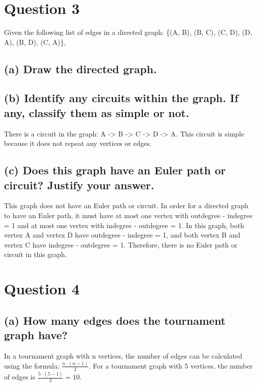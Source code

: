 \documentclass{article}
\begin{document}
\section*{Question 3}

Given the following list of edges in a directed graph: \{(A, B), (B, C), (C, D), (D, A), (B, D), (C, A)\},

\subsection*{(a) Draw the directed graph.}
\begin{center}
\end{center}

\subsection*{(b) Identify any circuits within the graph. If any, classify them as simple or not.}
There is a circuit in the graph: A -> B -> C -> D -> A. This circuit is simple because it does not repeat any vertices or edges.

\subsection*{(c) Does this graph have an Euler path or circuit? Justify your answer.}
This graph does not have an Euler path or circuit. In order for a directed graph to have an Euler path, it must have at most one vertex with outdegree - indegree = 1 and at most one vertex with indegree - outdegree = 1. In this graph, both vertex A and vertex D have outdegree - indegree = 1, and both vertex B and vertex C have indegree - outdegree = 1. Therefore, there is no Euler path or circuit in this graph.

\section*{Question 4}
\subsection*{(a) How many edges does the tournament graph have?}
In a tournament graph with n vertices, the number of edges can be calculated using the formula: \( \frac{{n \cdot (n-1)}}{2} \).
For a tournament graph with 5 vertices, the number of edges is \( \frac{{5 \cdot (5-1)}}{2} = 10 \).
\end{document}

